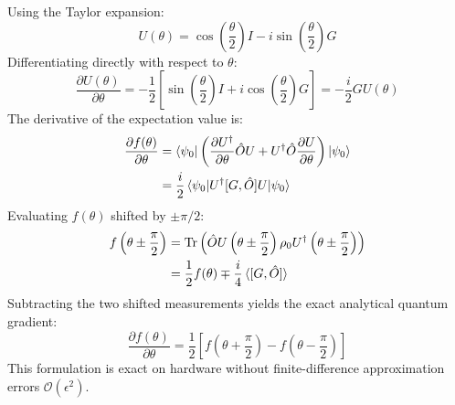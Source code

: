 Using the Taylor expansion:
\begin{equation}
    U(\theta) = \cos\left(\frac{\theta}{2}\right) I - i \sin\left(\frac{\theta}{2}\right) G
\end{equation}
Differentiating directly with respect to $\theta$:
\begin{equation}
    \frac{\partial U(\theta)}{\partial \theta} = -\frac{1}{2} \left[ \sin\left(\frac{\theta}{2}\right) I + i \cos\left(\frac{\theta}{2}\right) G \right] = -\frac{i}{2} G U(\theta)
\end{equation}
The derivative of the expectation value is:
\begin{align}
    \frac{\partial f(\theta)}{\partial \theta} &= \braket{\psi_0 | \left( \frac{\partial U^\dagger}{\partial \theta} \hat{O} U + U^\dagger \hat{O} \frac{\partial U}{\partial \theta} \right) | \psi_0} \notag \\
    &= \frac{i}{2} \braket{\psi_0 | U^\dagger [G, \hat{O}] U | \psi_0}
\end{align}
Evaluating $f(\theta)$ shifted by $\pm \pi/2$:
\begin{align}
    f\left(\theta \pm \frac{\pi}{2}\right) &= \mathrm{Tr}\left( \hat{O} U\left(\theta \pm \frac{\pi}{2}\right) \rho_0 U^\dagger\left(\theta \pm \frac{\pi}{2}\right) \right) \notag \\
    &= \frac{1}{2} f(\theta) \mp \frac{i}{4} \braket{[G, \hat{O}]}
\end{align}
Subtracting the two shifted measurements yields the exact analytical quantum gradient:
\begin{equation}
    \frac{\partial f(\theta)}{\partial \theta} = \frac{1}{2} \left[ f\left(\theta + \frac{\pi}{2}\right) - f\left(\theta - \frac{\pi}{2}\right) \right]
\end{equation}
This formulation is exact on hardware without finite-difference approximation errors $\mathcal{O}(\epsilon^2)$.
